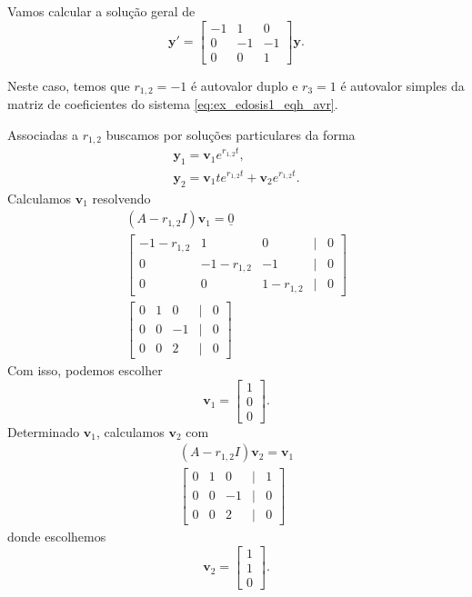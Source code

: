 \begin{ex}
  Vamos calcular a solução geral de
  \begin{equation}\label{eq:ex_edosis1_eqh_avr}
    \pmb{y}' =
    \begin{bmatrix}
      -1 & 1 & 0 \\
      0 & -1 & -1 \\
      0 & 0 & 1
    \end{bmatrix}
    \pmb{y}.
  \end{equation}

  Neste caso, temos que $r_{1,2} = -1$ é autovalor duplo e $r_3=1$ é autovalor simples da matriz de coeficientes do sistema \eqref{eq:ex_edosis1_eqh_avr}.
  
  Associadas a $r_{1,2}$ buscamos por soluções particulares da forma
  \begin{align}
    \pmb{y}_1 = \pmb{v}_1e^{r_{1,2}t}, \\
    \pmb{y}_2 = \pmb{v}_1te^{r_{1,2}t} + \pmb{v}_2e^{r_{1,2}t}.
  \end{align}
  Calculamos $\pmb{v}_1$ resolvendo
  \begin{gather}
    (A - r_{1,2}I)\pmb{v}_1 = \underline{0} \\
    \begin{bmatrix}
      -1-r_{1,2} & 1 & 0 & | & 0 \\
      0 & -1-r_{1,2} & -1 & | & 0 \\
      0 & 0 & 1-r_{1,2} & | & 0
    \end{bmatrix}\\
    \begin{bmatrix}
      0 & 1 & 0 & | & 0 \\
      0 & 0 & -1 & | & 0 \\
      0 & 0 &  2 & | & 0
    \end{bmatrix}
  \end{gather}
  Com isso, podemos escolher
  \begin{equation}
    \pmb{v}_1 =
    \begin{bmatrix}
      1 \\
      0 \\
      0
    \end{bmatrix}.
  \end{equation}
  Determinado $\pmb{v}_1$, calculamos $\pmb{v}_2$ com
  \begin{gather}
    (A-r_{1,2}I)\pmb{v}_2 = \pmb{v}_1 \\
    \begin{bmatrix}
      0 & 1 & 0 & | & 1 \\
      0 & 0 & -1 & | & 0 \\
      0 & 0 & 2 & | & 0
    \end{bmatrix}
  \end{gather}
  donde escolhemos
  \begin{equation}
    \pmb{v}_2 =
    \begin{bmatrix}
      1 \\
      1 \\
      0
    \end{bmatrix}.
  \end{equation}


\end{ex}
